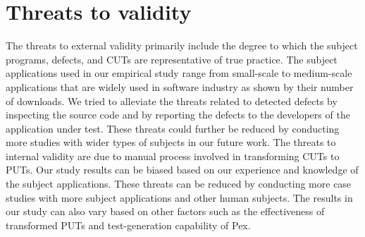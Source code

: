 \section{Threats to validity}
\label{sec:tov}

The threats to external validity primarily include the degree to which the subject programs, defects, and CUTs are representative of true practice. The subject applications used in our empirical study range from small-scale to medium-scale applications that are widely used in software industry as shown by their number of downloads. We tried to alleviate the threats related to detected defects by inspecting the source code and by reporting the defects to the developers of the application under test. These threats could further be reduced by conducting more studies with wider types of subjects in our future work. The threats to internal validity are due to manual process involved in transforming CUTs to PUTs. Our study results can be biased based on our experience and knowledge of the subject applications. These threats can be reduced by conducting more case studies with more subject applications and other human subjects. The results in our study can also vary based on other factors such as the effectiveness of transformed PUTs and test-generation capability of Pex.